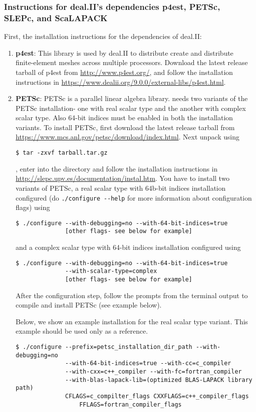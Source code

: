 \subsubsection{Instructions for deal.II's dependencies p4est, PETSc, SLEPc, and ScaLAPACK}
First, the installation instructions for the dependencies of deal.II:
\begin{enumerate}
	\item   {\bf p4est}: This library is used by deal.II to distribute create and distribute finite-element meshes across multiple processors. Download the latest release tarball of p4est from \url{http://www.p4est.org/}, and follow the installation instructions in \url{https://www.dealii.org/9.0.0/external-libs/p4est.html}. 

	\item {\bf PETSc}: PETSc is a parallel linear algebra library. \dftfe{} needs two variants of the PETSc installation- one with real scalar type and the another with complex scalar type. Also 64-bit indices must be enabled in both the installation variants. To install PETSc, first download the latest release tarball from \url{https://www.mcs.anl.gov/petsc/download/index.html}. Next unpack using
\begin{verbatim}
$ tar -zxvf tarball.tar.gz
\end{verbatim}		
, enter into the directory and follow the installation instructions in \url{http://slepc.upv.es/documentation/instal.htm}. You have to install two variants of PETSc, a real scalar type with 64b-bit indices installation configured (do \verb|./configure --help| for more information about configuration flags) using
\begin{verbatim}
$ ./configure --with-debugging=no --with-64-bit-indices=true
              [other flags- see below for example]
\end{verbatim}
and a complex scalar type with 64-bit indices installation configured using
\begin{verbatim}
$ ./configure --with-debugging=no --with-64-bit-indices=true 
              --with-scalar-type=complex 
              [other flags- see below for example]
\end{verbatim}
After the configuration step, follow the prompts from the terminal output to compile and install PETSc (see example below).

Below, we show an example installation for the real scalar type variant. 
This example should be used only as a reference.
\begin{verbatim}
$ ./configure --prefix=petsc_installation_dir_path --with-debugging=no 
              --with-64-bit-indices=true --with-cc=c_compiler
              --with-cxx=c++_compiler --with-fc=fortran_compiler
              --with-blas-lapack-lib=(optimized BLAS-LAPACK library path) 
              CFLAGS=c_compilter_flags CXXFLAGS=c++_compiler_flags
	              FFLAGS=fortran_compiler_flags


\end{verbatim}
\end{enumerate}
